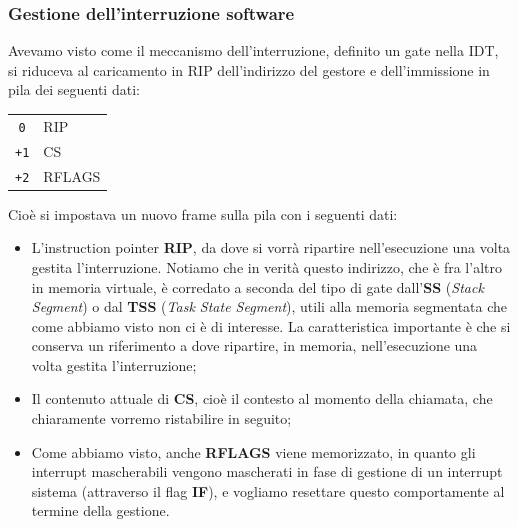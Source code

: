 \documentclass[a4paper,11pt]{article}
\begin{document}
\subsubsection{Gestione dell'interruzione software}
Avevamo visto come il meccanismo dell'interruzione, definito un gate nella IDT, si riduceva al caricamento in RIP dell'indirizzo del gestore e dell'immissione in pila dei seguenti dati:
\begin{table}[H]
	\center
	\begin{tabular} { c | p{5cm} }
		\lstinline|0| & RIP \\
		\lstinline|+1| & CS \\
		\lstinline|+2| & RFLAGS 
	\end{tabular}
\end{table}
Cioè si impostava un nuovo frame sulla pila con i seguenti dati:
\begin{itemize}
	\item L'instruction pointer \textbf{RIP}, da dove si vorrà ripartire nell'esecuzione una volta gestita l'interruzione.
		Notiamo che in verità questo indirizzo, che è fra l'altro in memoria virtuale, è corredato a seconda del tipo di gate dall'\textbf{SS} (\textit{Stack Segment}) o dal \textbf{TSS} (\textit{Task State Segment}), utili alla memoria segmentata che come abbiamo visto non ci è di interesse. La caratteristica importante è che si conserva un riferimento a dove ripartire, in memoria, nell'esecuzione una volta gestita l'interruzione;
	\item Il contenuto attuale di \textbf{CS}, cioè il contesto al momento della chiamata, che chiaramente vorremo ristabilire in seguito;
	\item Come abbiamo visto, anche \textbf{RFLAGS} viene memorizzato, in quanto gli interrupt mascherabili vengono mascherati in fase di gestione di un interrupt sistema (attraverso il flag \textbf{IF}), e vogliamo resettare questo comportamente al termine della gestione.
\end{itemize}
\end{document}
